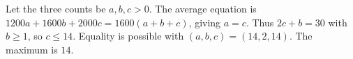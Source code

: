Let the three counts be $a,b,c>0$. The average equation is $1200a+1600b+2000c=1600(a+b+c)$, giving $a=c$. Thus $2c+b=30$ with $b\ge 1$, so $c\le 14$. Equality is possible with $(a,b,c)=(14,2,14)$. The maximum is $\boxed{14}$.

